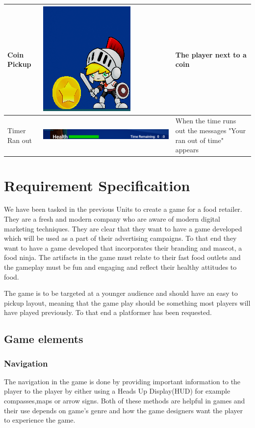 \documentclass{article}
\begin{document}
\begin{center}
\begin{tabular}{||p{2.5em}|p{10cm}|p{5cm}||}
	\hline	
		Coin Pickup & \includegraphics[scale=1]{Coin} & The player next to a coin \\
	\hline
		Timer Ran out & \includegraphics[scale=0.25]{Timeout} & When the time runs out the messages "Your ran out of time" appears \\
	\hline
\end{tabular}
\end{center}

\section{Requirement Specificaition}



We have been tasked in the previous Units to create a game for a food retailer. They are a fresh and modern company who are aware of modern digital marketing techniques.
They are clear that they want to have a game developed which will be used as a part of their advertising campaigns. To that end they want to have a game developed that incorporates their branding and mascot, a food ninja.
The artifacts in the game must relate to their fast food outlets and the gameplay must be fun and engaging and reflect their healthy attitudes to food. 

The game is to be targeted at a younger audience and should have an easy to pickup layout, meaning that the game play should be something most players will have played previously. To that end a platformer has been requested. 

\subsection{Game elements}
\subsubsection{Navigation}
The navigation in the game is done by providing important information to the player to the player by either using a Heads Up Display(HUD) for example compasses,maps or arrow signs. Both of these methods are helpful in games and their use depends on game's genre and how the game designers want the player to experience the game.
\end{document}
